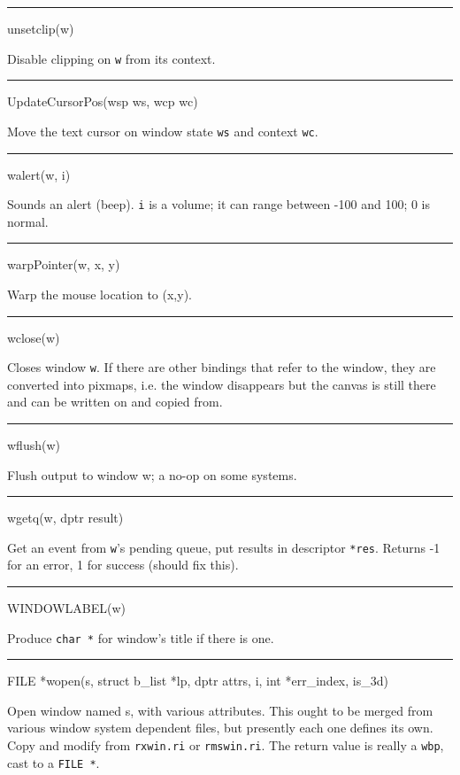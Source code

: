\bigskip\hrule\vspace{0.1cm}
\noindent
unsetclip(w)


Disable clipping on \texttt{w} from its context.


\bigskip\hrule\vspace{0.1cm}
\noindent
UpdateCursorPos(wsp ws, wcp wc)


Move the text cursor on window state \texttt{ws} and context \texttt{wc}.


\bigskip\hrule\vspace{0.1cm}
\noindent
walert(w, i)


Sounds an alert (beep). \texttt{i} is a volume; it can range between
-100 and 100; 0 is normal.


\bigskip\hrule\vspace{0.1cm}
\noindent
warpPointer(w, x, y)


Warp the mouse location to (x,y).


\bigskip\hrule\vspace{0.1cm}
\noindent
wclose(w)


Closes window \texttt{w}. If there are other bindings that refer to
the window, they are converted into pixmaps, i.e.  the window
disappears but the canvas is still there and can be written on and
copied from.


\bigskip\hrule\vspace{0.1cm}
\noindent
wflush(w)


Flush output to window w; a no-op on some systems.


\bigskip\hrule\vspace{0.1cm}
\noindent
wgetq(w, dptr result)


Get an event from \texttt{w}{}'s pending queue, put results in
descriptor \texttt{*res}. Returns -1 for an error, 1 for success
(should fix this).


\bigskip\hrule\vspace{0.1cm}
\noindent
WINDOWLABEL(w)


Produce \texttt{char *} for window's title if there is one.

\bigskip\hrule\vspace{0.1cm}
\noindent



FILE *wopen(s, struct b\_list *lp, dptr attrs, i, int *err\_index, is\_3d)


Open window named s, with various attributes. This ought to be merged
from various window system dependent files, but presently each one
defines its own. Copy and modify from \texttt{rxwin.ri} or
\texttt{rmswin.ri}. The return value is really a \texttt{wbp}, cast to
a \texttt{FILE *}.


